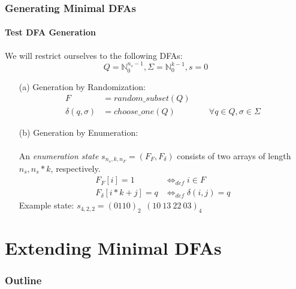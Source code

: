 \documentclass[handout,10pt,usenames,dvipsnames]{beamer}%
\newcommand{\nSO}{{n_s}}
\newcommand{\nF}{{n_F}}
\newcommand{\kAL}{k}
\newcommand{\gregorColor}{violet}
\newcommand{\gregor}[1]{\textcolor{\gregorColor}{#1}}
\begin{document}
	\begin{frame}
		\frametitle{Generating Minimal DFAs}
		\framesubtitle{Test DFA Generation}
		We will restrict ourselves to the following DFAs:
		\[
			Q = \mathbb{N}_0^ {\nSO-1}, \Sigma = \mathbb{N}_0^{\kAL-1}, s = 0
		\]\pause
		
		\begin{enumerate}
			\item[(a)] Generation by Randomization:
			\begin{align*}
			F &= random\_subset(Q)\\
			\delta(q, \sigma) &= choose\_one(Q) \qquad\qquad \forall q\in Q, \sigma\in\Sigma
			\end{align*}\pause
			
			\item[(b)] Generation by Enumeration:\\$ $\\
			An \emph{enumeration state} $s_{\nSO, \kAL, \nF} = (F_F,F_\delta)$ consists of two arrays of length $\nSO, \nSO*\kAL$, respectively.
			\begin{align*}
			F_F[i] = 1 &\Leftrightarrow_{def} i \in F\\
			F_\delta[i * \kAL + j] = q &\Leftrightarrow_{def} \delta(i, j) = q
			\end{align*}
			Example state: $s_{4, 2, 2} = (0110)_2\ \ (10\ 13\ 22\ 03)_4$
		\end{enumerate}
	
	\end{frame}

%		
%	
	
	\section{Extending Minimal DFAs}
	
	\begin{frame}
		\frametitle{Outline}
		\tableofcontents[currentsection] %
	\end{frame}
	
	
\end{document}
